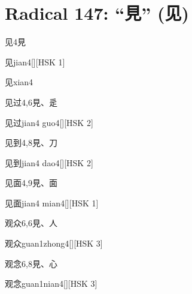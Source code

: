 
\section*{Radical 147: ``⾒'' (见)}

\begin{entry}{见}{4}{⾒}
  \begin{phonetics}{见}{jian4}[][HSK 1]
  \end{phonetics}
  \begin{phonetics}{见}{xian4}
  \end{phonetics}
\end{entry}

\begin{entry}{见过}{4,6}{⾒、⾡}
  \begin{phonetics}{见过}{jian4 guo4}[][HSK 2]
  \end{phonetics}
\end{entry}

\begin{entry}{见到}{4,8}{⾒、⼑}
  \begin{phonetics}{见到}{jian4 dao4}[][HSK 2]
  \end{phonetics}
\end{entry}

\begin{entry}{见面}{4,9}{⾒、⾯}
  \begin{phonetics}{见面}{jian4 mian4}[][HSK 1]
  \end{phonetics}
\end{entry}

\begin{entry}{观众}{6,6}{⾒、⼈}
  \begin{phonetics}{观众}{guan1zhong4}[][HSK 3]
  \end{phonetics}
\end{entry}

\begin{entry}{观念}{6,8}{⾒、⼼}
  \begin{phonetics}{观念}{guan1nian4}[][HSK 3]
  \end{phonetics}
\end{entry}

